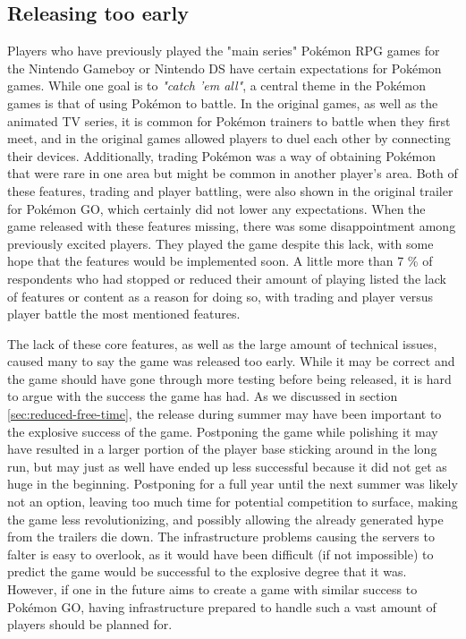 
\subsection{Releasing too early}
Players who have previously played the "main series" Pokémon RPG games for the Nintendo Gameboy or Nintendo DS have certain expectations for Pokémon games. While one goal is to \emph{"catch 'em all"}, a central theme in the Pokémon games is that of using Pokémon to battle. In the original games, as well as the animated TV series, it is common for Pokémon trainers to battle when they first meet, and in the original games allowed players to duel each other by connecting their devices. Additionally, trading Pokémon was a way of obtaining Pokémon that were rare in one area but might be common in another player's area. Both of these features, trading and player battling, were also shown in the original trailer for Pokémon GO, which certainly did not lower any expectations. When the game released with these features missing, there was some disappointment among previously excited players. They played the game despite this lack, with some hope that the features would be implemented soon. A little more than 7 \% of respondents who had stopped or reduced their amount of playing listed the lack of features or content as a reason for doing so, with trading and player versus player battle the most mentioned features.

The lack of these core features, as well as the large amount of technical issues, caused many to say the game was released too early. While it may be correct and the game should have gone through more testing before being released, it is hard to argue with the success the game has had. As we discussed in section \ref{sec:reduced-free-time}, the release during summer may have been important to the explosive success of the game. Postponing the game while polishing it may have resulted in a larger portion of the player base sticking around in the long run, but may just as well have ended up less successful because it did not get as huge in the beginning.  Postponing for a full year until the next summer was likely not an option, leaving too much time for potential competition to surface, making the game less revolutionizing, and possibly allowing the already generated hype from the trailers die down. The infrastructure problems causing the servers to falter is easy to overlook, as it would have been difficult (if not impossible) to predict the game would be successful to the explosive degree that it was. However, if one in the future aims to create a game with similar success to Pokémon GO, having infrastructure prepared to handle such a vast amount of players should be planned for.

